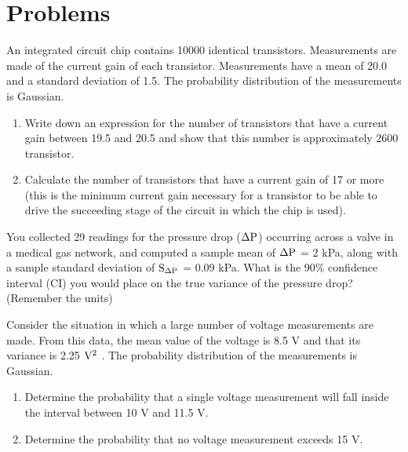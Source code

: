 \documentclass[a4paper,11pt]{book}
\begin{document}
\onecolumn

\chapter*{Problems}


\begin{question}
An integrated circuit chip contains 10000 identical transistors. Measurements are made of the current gain of each transistor. Measurements have a mean of 20.0 and a standard deviation of 1.5. The probability distribution of the measurements is
Gaussian.

\begin{enumerate}
\item Write down an expression for the number of transistors that have a current gain between 19.5 and 20.5 and show that this number is approximately 2600 transistor.
\item Calculate the number of transistors that have a current gain of 17 or more (this is the minimum current gain necessary for a transistor to be able to drive the succeeding stage of the circuit in which the chip is used).
\end{enumerate}
\examspace*{10em}

\end{question}
\begin{solution}


\end{solution}


\begin{question}
You collected 29 readings for the pressure drop ($\rm \Delta P$) occurring across a valve in a medical gas network, and computed a sample mean of $\rm \Delta P$ = 2 kPa, along with a
sample standard deviation of $\rm S_{\Delta P}$ = 0.09 kPa. What is the 90\% confidence interval (CI) you would place on the true variance of the pressure drop? (Remember the units)

\examspace*{10em}

\end{question}
\begin{solution}


\end{solution}


\begin{question}
Consider the situation in which a large number of voltage measurements are made. From this data, the mean value of the voltage is 8.5 V and that its variance is 2.25 $\rm V^2$ . The probability distribution of the
measurements is Gaussian.

\begin{enumerate}
\item Determine the probability that a single voltage measurement will fall inside the interval between 10 V and 11.5 V.
\item Determine the probability that no voltage measurement exceeds 15 V.
\end{enumerate}

\examspace*{10em}

\end{question}
\begin{solution}


\end{solution}
\end{document}

